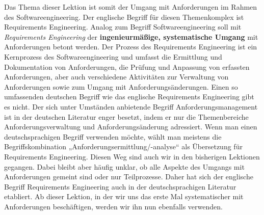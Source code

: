 Das  Thema dieser Lektion ist somit der Umgang mit Anforderungen im Rahmen des Softwareengineering. Der englische Begriff für diesen Themenkomplex ist Requirements Engineering. Analog zum Begriff Softwareengineering soll mit \textit{Requirements Engineering} der \textbf{ingenieurmäßige, systematische Umgang} mit Anforderungen betont werden. Der Prozess des Requirements Engineering ist ein Kernprozess des Softwareengineering und umfasst die Ermittlung und Dokumentation von Anforderungen, die Prüfung und Anpassung von erfassten Anforderungen, aber auch verschiedene Aktivitäten zur Verwaltung von Anforderungen sowie zum Umgang mit Anforderungsänderungen. Einen so umfassenden deutschen Begriff wie das englische Requirements Engineering gibt es nicht. Der sich unter Umständen anbietende Begriff Anforderungsmanagement ist in der deutschen Literatur enger besetzt, indem er nur die Themenbereiche Anforderungsverwaltung und Anforderungs\-änderung adressiert. Wenn man einen deutschsprachigen Begriff verwenden möchte, wählt man meistens die Begriffskombination „Anforderungsermittlung/-analyse“ als Übersetzung für Requirements Engineering. Diesen Weg sind auch wir in den bisherigen Lektionen gegangen. Dabei bleibt aber häufig unklar, ob alle Aspekte des Umgangs mit Anforderungen gemeint sind oder nur Teilprozesse. Daher hat sich der englische Begriff Requirements Engineering auch in der deutschsprachigen Literatur etabliert. Ab dieser Lektion, in der wir uns das erste Mal systematischer mit Anforderungen beschäftigen, werden wir ihn nun ebenfalls verwenden.

